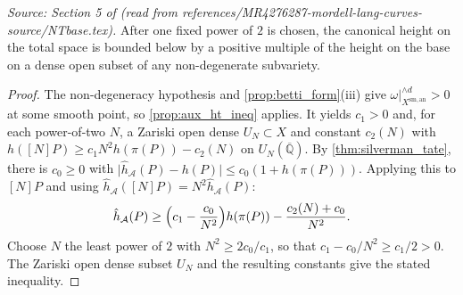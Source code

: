 \begin{theorem}
  \label{thm:ht_inequality}
  \textit{Source: Section 5 of \cite{MR4276287-mordell-lang-curves} (read from references/MR4276287-mordell-lang-curves-source/NTbase.tex).}
  After one fixed power of \(2\) is chosen, the canonical height on the total
  space is bounded below by a positive multiple of the height on the base on a
  dense open subset of any non-degenerate subvariety.
\end{theorem}

\begin{proof}
  The non-degeneracy hypothesis and \cref{prop:betti_form}(iii) give
  \(\omega|_{X^{\mathrm{sm,an}}}^{\wedge d} > 0\) at some smooth point,
  so \cref{prop:aux_ht_ineq} applies. It yields \(c_1 > 0\) and,
  for each power-of-two \(N\), a Zariski open dense \(U_N \subset X\)
  and constant \(c_2(N)\) with
  \(h([N]P) \ge c_1 N^2 h(\pi(P)) - c_2(N)\) on \(U_N(\overline{\mathbb{Q}})\).
  By \cref{thm:silverman_tate}, there is \(c_0 \ge 0\) with
  \(\bigl|\hat{h}_{\mathcal{A}}(P) - h(P)\bigr| \le c_0(1 + h(\pi(P)))\).
  Applying this to \([N]P\) and using \(\hat{h}_{\mathcal{A}}([N]P) = N^2\hat{h}_{\mathcal{A}}(P)\):
  \[\hat{h}_{\mathcal{A}}(P) \ge \Bigl(c_1 - \frac{c_0}{N^2}\Bigr) h(\pi(P)) - \frac{c_2(N) + c_0}{N^2}.\]
  Choose \(N\) the least power of \(2\) with \(N^2 \ge 2c_0/c_1\), so that
  \(c_1 - c_0/N^2 \ge c_1/2 > 0\). The Zariski open dense subset \(U_N\) and the
  resulting constants give the stated inequality.
\end{proof}

